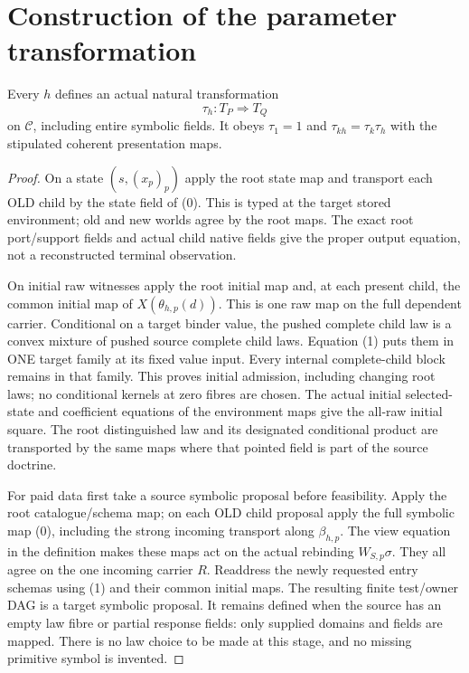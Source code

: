 \documentclass[11pt]{article}
\begin{document}
\section{Construction of the parameter transformation}
\begin{theorem}
Every $h$ defines an actual natural transformation
\[
                 \tau_h:T_P\Longrightarrow T_Q
\]
on $\mathcal C$, including entire symbolic fields. It obeys $\tau_1=1$ and $\tau_{kh}=\tau_k\tau_h$ with the stipulated coherent presentation maps.
\end{theorem}
\begin{proof}
On a state $(s,(x_p)_p)$ apply the root state map and transport each OLD child by the state field of (0). This is typed at the target stored environment; old and new worlds agree by the root maps. The exact root port/support fields and actual child native fields give the proper output equation, not a reconstructed terminal observation.

On initial raw witnesses apply the root initial map and, at each present child, the common initial map of $X(\theta_{h,p}(d))$. This is one raw map on the full dependent carrier. Conditional on a target binder value, the pushed complete child law is a convex mixture of pushed source complete child laws. Equation (1) puts them in ONE target family at its fixed value input. Every internal complete-child block remains in that family. This proves initial admission, including changing root laws; no conditional kernels at zero fibres are chosen. The actual initial selected-state and coefficient equations of the environment maps give the all-raw initial square. The root distinguished law and its designated conditional product are transported by the same maps where that pointed field is part of the source doctrine.

For paid data first take a source symbolic proposal before feasibility. Apply the root catalogue/schema map; on each OLD child proposal apply the full symbolic map (0), including the strong incoming transport along $\beta_{h,p}$. The view equation in the definition makes these maps act on the actual rebinding $W_{S,p}\sigma$. They all agree on the one incoming carrier $R$. Readdress the newly requested entry schemas using (1) and their common initial maps. The resulting finite test/owner DAG is a target symbolic proposal. It remains defined when the source has an empty law fibre or partial response fields: only supplied domains and fields are mapped. There is no law choice to be made at this stage, and no missing primitive symbol is invented.


\end{proof}
\end{document}
